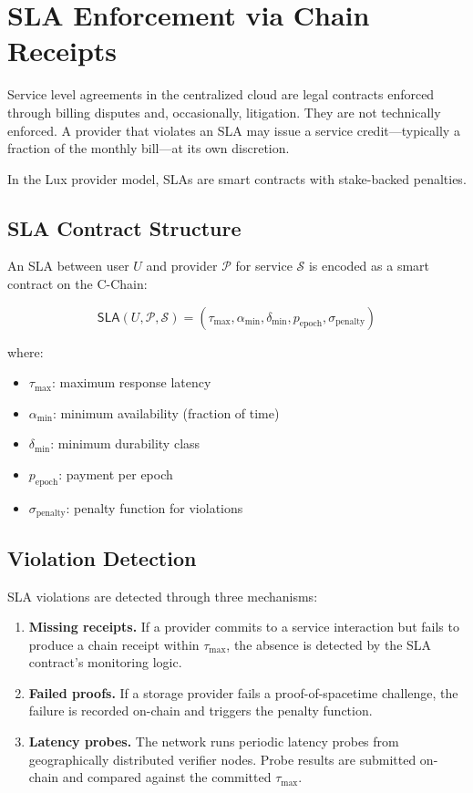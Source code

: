 \section{SLA Enforcement via Chain Receipts}
\label{sec:sla}

Service level agreements in the centralized cloud are legal contracts enforced
through billing disputes and, occasionally, litigation. They are not technically
enforced. A provider that violates an SLA may issue a service credit---typically
a fraction of the monthly bill---at its own discretion.

In the Lux provider model, SLAs are smart contracts with stake-backed penalties.

\subsection{SLA Contract Structure}

An SLA between user $U$ and provider $\mathcal{P}$ for service $\mathcal{S}$
is encoded as a smart contract on the C-Chain:

\begin{equation}
    \mathsf{SLA}(U, \mathcal{P}, \mathcal{S}) = (\tau_{\max}, \alpha_{\min}, \delta_{\min}, p_{\text{epoch}}, \sigma_{\text{penalty}})
\end{equation}

where:
\begin{itemize}
    \item $\tau_{\max}$: maximum response latency
    \item $\alpha_{\min}$: minimum availability (fraction of time)
    \item $\delta_{\min}$: minimum durability class
    \item $p_{\text{epoch}}$: payment per epoch
    \item $\sigma_{\text{penalty}}$: penalty function for violations
\end{itemize}

\subsection{Violation Detection}

SLA violations are detected through three mechanisms:

\begin{enumerate}
    \item \textbf{Missing receipts.} If a provider commits to a service
    interaction but fails to produce a chain receipt within $\tau_{\max}$,
    the absence is detected by the SLA contract's monitoring logic.

    \item \textbf{Failed proofs.} If a storage provider fails a
    proof-of-spacetime challenge, the failure is recorded on-chain and
    triggers the penalty function.

    \item \textbf{Latency probes.} The network runs periodic latency probes
    from geographically distributed verifier nodes. Probe results are
    submitted on-chain and compared against the committed $\tau_{\max}$.
\end{enumerate}

